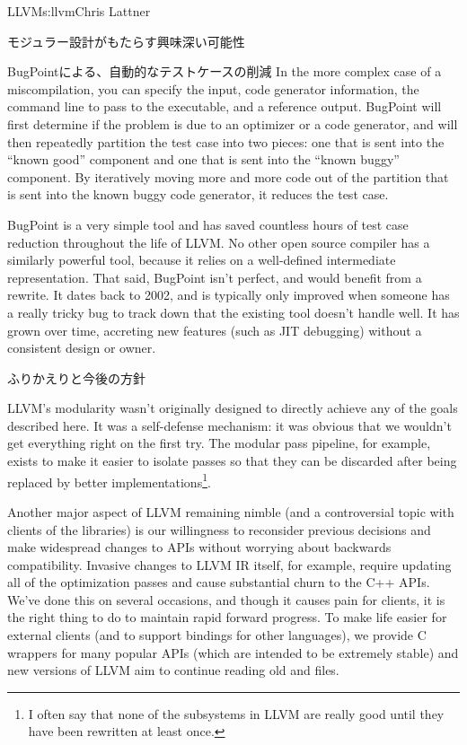 \begin{aosachapter}{LLVM}{s:llvm}{Chris Lattner}
\begin{aosasect1}{モジュラー設計がもたらす興味深い可能性}
\begin{aosasect2}{BugPointによる、自動的なテストケースの削減}
In the more complex case of a miscompilation, you can specify the
input, code generator information, the command line to pass to the
executable, and a reference output. BugPoint will first determine if
the problem is due to an optimizer or a code generator, and will then
repeatedly partition the test case into two pieces: one that is sent
into the ``known good'' component and one that is sent into the
``known buggy'' component.  By iteratively moving more and more code
out of the partition that is sent into the known buggy code generator,
it reduces the test case.

BugPoint is a very simple tool and has saved countless hours of test
case reduction throughout the life of LLVM\@.  No other open source
compiler has a similarly powerful tool, because it relies on a
well-defined intermediate representation.  That said, BugPoint isn't
perfect, and would benefit from a rewrite.  It dates back to 2002, and
is typically only improved when someone has a really tricky bug to
track down that the existing tool doesn't handle well. It has grown
over time, accreting new features (such as JIT debugging) without a
consistent design or owner.

\end{aosasect2}

\end{aosasect1}

\begin{aosasect1}{ふりかえりと今後の方針}

LLVM's modularity wasn't originally designed to directly achieve any
of the goals described here. It was a self-defense mechanism: it was
obvious that we wouldn't get everything right on the first try.  The
modular pass pipeline, for example, exists to make it easier to
isolate passes so that they can be discarded after being replaced by
better implementations\footnote{I often say that none of the
subsystems in LLVM are really good until they have been rewritten at
least once.}.

Another major aspect of LLVM remaining nimble (and a controversial
topic with clients of the libraries) is our willingness to reconsider
previous decisions and make widespread changes to APIs without
worrying about backwards compatibility.  Invasive changes to LLVM IR
itself, for example, require updating all of the optimization passes
and cause substantial churn to the C++ APIs.  We've done this on
several occasions, and though it causes pain for clients, it is the
right thing to do to maintain rapid forward progress.  To make life
easier for external clients (and to support bindings for other
languages), we provide C wrappers for many popular APIs (which are
intended to be extremely stable) and new versions of LLVM aim to
continue reading old  and  files.


\end{aosasect1}
\end{aosachapter}
